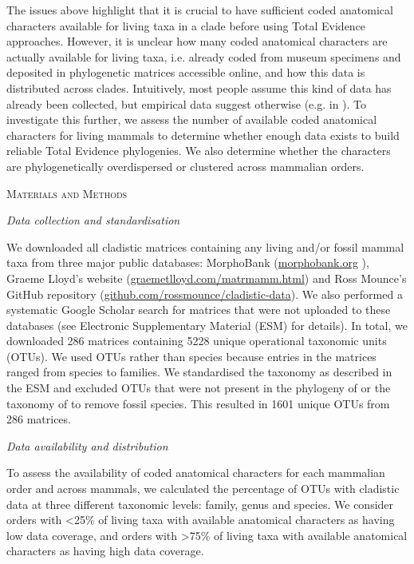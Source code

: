 \documentclass[12pt,letterpaper]{article}
\renewcommand{\section}[1]{%
\bigskip
\begin{center}
\begin{Large}
\normalfont\scshape #1
\medskip
\end{Large}
\end{center}}
\renewcommand{\subsection}[1]{%
\bigskip
\begin{center}
\begin{large}
\normalfont\itshape #1
\end{large}
\end{center}}
\begin{document}
The issues above highlight that it is crucial to have sufficient coded anatomical characters available for living taxa in a clade before using Total Evidence approaches.
However, it is unclear how many coded anatomical characters are actually available for living taxa, i.e. already coded from museum specimens and deposited in phylogenetic matrices accessible online, and how this data is distributed across clades.
Intuitively, most people assume this kind of data has already been collected, but empirical data suggest otherwise (e.g. in \cite{ronquista2012,slaterphylogenetic2013,beckancient2014}).
To investigate this further, we assess the number of available coded anatomical characters for living mammals to determine whether enough data exists to build reliable Total Evidence phylogenies.
We also determine whether the characters are phylogenetically overdispersed or clustered across mammalian orders.

%
%

\section{Materials and Methods}
\subsection{Data collection and standardisation}
We downloaded all cladistic matrices containing any living and/or fossil mammal taxa from three major public databases: MorphoBank (\url{morphobank.org} \cite{morphobank}), Graeme Lloyd's website (\url{graemetlloyd.com/matrmamm.html}) and Ross Mounce's GitHub repository (\url{github.com/rossmounce/cladistic-data}).
We also performed a systematic Google Scholar search for matrices that were not uploaded to these databases (see Electronic Supplementary Material (ESM) for details).
In total, we downloaded 286 matrices containing 5228 unique operational taxonomic units (OTUs). 
We used OTUs rather than species because entries in the matrices ranged from species to families. 
We standardised the taxonomy as described in the ESM and excluded OTUs that were not present in the phylogeny of \cite{BinindaEmonds} or the taxonomy of \cite{wilson2005mammal} to remove fossil species.
This resulted in 1601 unique OTUs from 286 matrices.

\subsection{Data availability and distribution}
To assess the availability of coded anatomical characters for each mammalian order and across mammals, we calculated the percentage of OTUs with cladistic data at three different taxonomic levels: family, genus and species.
We consider orders with \textless 25\% of living taxa with available anatomical characters as having low data coverage, and orders with \textgreater 75\% of living taxa with available anatomical characters as having high data coverage. 
\end{document}
